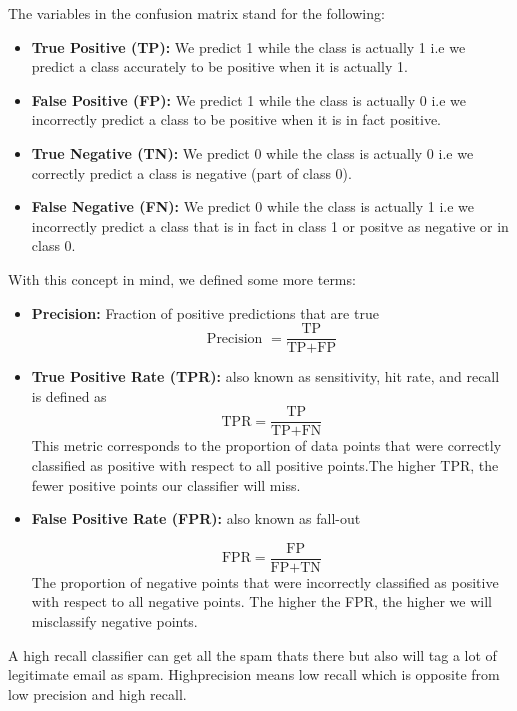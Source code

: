 \pagebreak

The variables in the confusion matrix stand for the following:  

\begin{itemize}
\item \textbf{True Positive (TP): }  We predict 1 while the class is actually 1 i.e we predict a class accurately to be positive when it is actually 1. 

\item \textbf{False Positive (FP): } We predict 1 while the class is actually 0 i.e we incorrectly predict a class to be positive when it is in fact positive.  

\item \textbf{True Negative (TN): } We predict 0 while the class is actually 0 i.e we correctly predict a class is negative (part of class 0). 

\item \textbf{False Negative (FN): } We predict 0 while the class is actually 1 i.e we incorrectly predict a class that is in fact in class 1 or positve as negative or in class 0.  

\end{itemize}
With this concept in mind, we defined some more terms: 

\begin{itemize}
\item \textbf{Precision: } Fraction of positive predictions that are true 
$$\text{Precision } =  \frac{\text{TP}}{\text{TP} + \text{FP}}$$

\item \textbf{True Positive Rate (TPR): } also known as sensitivity, hit rate, and recall is defined as
$$
\text{TPR} = \frac{\text{TP}}{\text{TP} + \text{FN}}
$$
This metric corresponds to the proportion of data points that were correctly classified as positive with respect to all positive points.The higher TPR, the fewer positive points our classifier will miss.

\item \textbf{False Positive Rate (FPR): } also known as fall-out

$$
\text{FPR} = \frac{\text{FP}}{\text{FP} + \text{TN}}
$$
The proportion of negative points that were incorrectly classified as positive with respect to all negative points.  The higher the FPR, the higher we will misclassify negative points.  
\end{itemize}

A high recall classifier can get all the spam thats there but also will tag a lot of legitimate email as spam.  
Highprecision means low recall which is opposite from low precision and high recall.  

